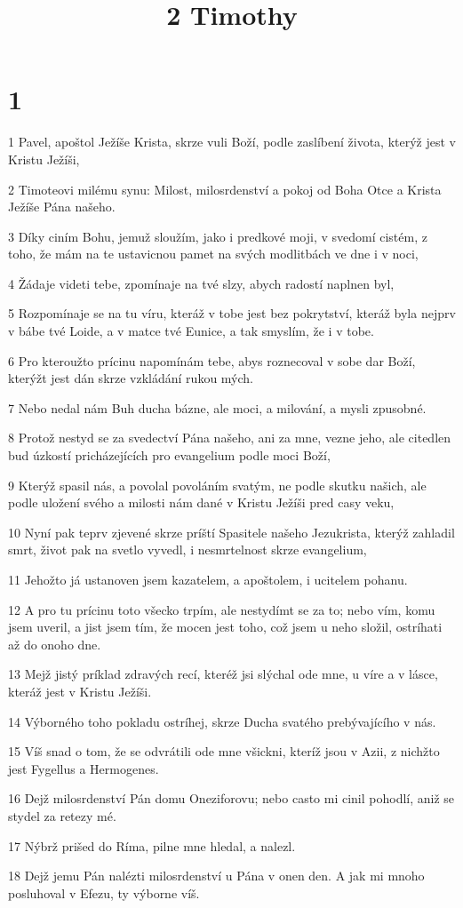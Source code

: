

\title{2 Timothy}

\chapter{1}

\par 1 Pavel, apoštol Ježíše Krista, skrze vuli Boží, podle zaslíbení života, kterýž jest v Kristu Ježíši,
\par 2 Timoteovi milému synu: Milost, milosrdenství a pokoj od Boha Otce a Krista Ježíše Pána našeho.
\par 3 Díky ciním Bohu, jemuž sloužím, jako i predkové moji, v svedomí cistém, z toho, že mám na te ustavicnou pamet na svých modlitbách ve dne i v noci,
\par 4 Žádaje videti tebe, zpomínaje na tvé slzy, abych radostí naplnen byl,
\par 5 Rozpomínaje se na tu víru, kteráž v tobe jest bez pokrytství, kteráž byla nejprv v bábe tvé Loide, a v matce tvé Eunice, a tak smyslím, že i v tobe.
\par 6 Pro kteroužto prícinu napomínám tebe, abys roznecoval v sobe dar Boží, kterýžt jest dán skrze vzkládání rukou mých.
\par 7 Nebo nedal nám Buh ducha bázne, ale moci, a milování, a mysli zpusobné.
\par 8 Protož nestyd se za svedectví Pána našeho, ani za mne, vezne jeho, ale citedlen bud úzkostí pricházejících pro evangelium podle moci Boží,
\par 9 Kterýž spasil nás, a povolal povoláním svatým, ne podle skutku našich, ale podle uložení svého a milosti nám dané v Kristu Ježíši pred casy veku,
\par 10 Nyní pak teprv zjevené skrze príští Spasitele našeho Jezukrista, kterýž zahladil smrt, život pak na svetlo vyvedl, i nesmrtelnost skrze evangelium,
\par 11 Jehožto já ustanoven jsem kazatelem, a apoštolem, i ucitelem pohanu.
\par 12 A pro tu prícinu toto všecko trpím, ale nestydímt se za to; nebo vím, komu jsem uveril, a jist jsem tím, že mocen jest toho, což jsem u neho složil, ostríhati až do onoho dne.
\par 13 Mejž jistý príklad zdravých recí, kteréž jsi slýchal ode mne, u víre a v lásce, kteráž jest v Kristu Ježíši.
\par 14 Výborného toho pokladu ostríhej, skrze Ducha svatého prebývajícího v nás.
\par 15 Víš snad o tom, že se odvrátili ode mne všickni, kteríž jsou v Azii, z nichžto jest Fygellus a Hermogenes.
\par 16 Dejž milosrdenství Pán domu Oneziforovu; nebo casto mi cinil pohodlí, aniž se stydel za retezy mé.
\par 17 Nýbrž prišed do Ríma, pilne mne hledal, a nalezl.
\par 18 Dejž jemu Pán nalézti milosrdenství u Pána v onen den. A jak mi mnoho posluhoval v Efezu, ty výborne víš.

